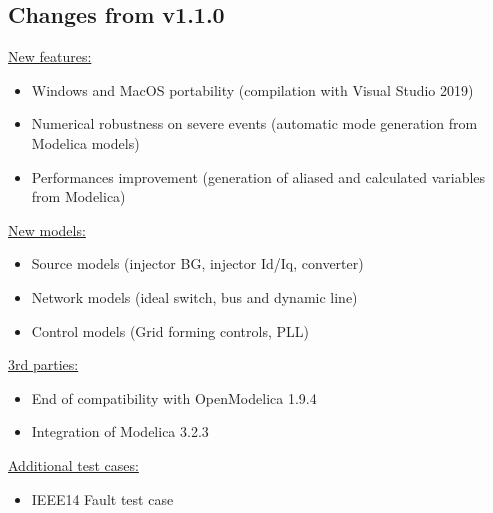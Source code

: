 \documentclass[a4paper, 12pt]{report}
\begin{document}
\subsection{Changes from v1.1.0}

\underline{New features:}
\begin{itemize}
\item Windows and MacOS portability (compilation with Visual Studio 2019)
\item Numerical robustness on severe events (automatic mode generation from Modelica models)
\item Performances improvement (generation of aliased and calculated variables from Modelica)
\end{itemize}

\underline{New models:}
\begin{itemize}
\item Source models (injector BG, injector Id/Iq, converter)
\item Network models (ideal switch, bus and dynamic line)
\item Control models (Grid forming controls, PLL)
\end{itemize}

\underline{3rd parties:}
\begin{itemize}
\item End of compatibility with OpenModelica 1.9.4
\item Integration of Modelica 3.2.3
\end{itemize}

\underline{Additional test cases:}
\begin{itemize}
\item IEEE14 Fault test case
\end{itemize}
\end{document}
